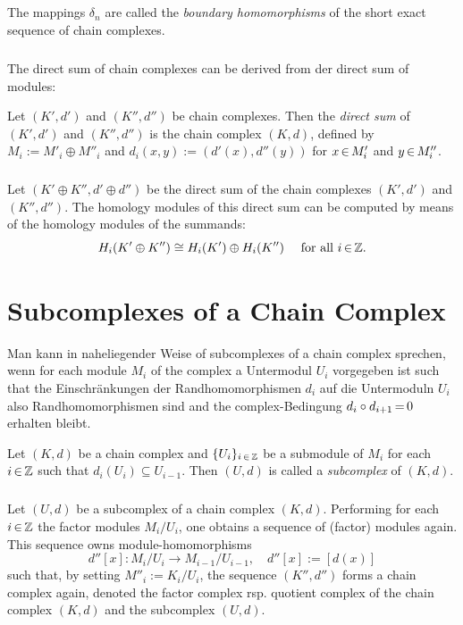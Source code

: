 \documentclass[11pt,twoside]{article}
\begin{document}
\subparagraph{}
The mappings $\delta_n$ are called the \textit{boundary homomorphisms}
of the short exact sequence of chain complexes.

\subparagraph{}
The direct sum of chain complexes can be derived from der direct sum of modules:

\begin{definition}
Let $(K',d')$ and $(K'',d'')$ be chain complexes.
Then the \textit{direct sum} of $(K',d')$ and $(K'',d'')$
is the chain complex $(K,d)$,
defined by $M_i := M'_i \oplus M''_i$ and $d_i(x,y) := (d'(x),d''(y))$
for $x {\,\in\,} M'_i$ and $y {\,\in\,} M''_i$.
\end{definition}

\subparagraph{}
Let $(K' \oplus K'', d' \oplus d'')$ be the direct sum of the chain complexes
$(K',d')$ and $(K'',d'')$.
The homology modules of this direct sum can be computed by means of
the homology modules of the summands:
\[
H_i(K' \oplus K'') \cong H_i(K') \oplus H_i(K'') \quad \mbox{ for all } i {\,\in\,} {\mathbb{Z}}.
\]

\section{Subcomplexes of a Chain Complex}
Man kann in naheliegender Weise of subcomplexes of a chain complex
sprechen,
wenn for each module $M_i$ of the complex a Untermodul $U_i$ vorgegeben ist
such that
the Einschränkungen der Randhomomorphismen $d_i$ auf die
Untermoduln $U_i$ also Randhomomorphismen sind
and the complex-Bedingung $d_i \circ d_{i+1} {\,=\,} 0$ erhalten bleibt.

\begin{definition}
Let $(K,d)$ be a chain complex and $\{U_i\}_{i {\,\in\,} {\mathbb{Z}}}$ be 
a submodule of $M_i$ for each $i {\,\in\,} {\mathbb{Z}}$
such that $d_i(U_i) \subseteq U_{i-1}$.
Then $(U,d)$ is called a \textit{subcomplex} of $(K,d)$.
\end{definition}

\subparagraph{}
Let $(U,d)$ be a subcomplex of a chain complex $(K,d)$.
Performing for each $i {\,\in\,} {\mathbb{Z}}$ the factor modules $M_i/U_i$,
one obtains a sequence of (factor) modules again.
This sequence owns module-homomorphisms 
\[
d''[x]: M_i/U_i \to M_{i-1}/U_{i-1}, \quad d''[x] := [d(x)]
\]
such that,
by setting $M''_i := K_i/U_i$,
the sequence $(K'',d'')$ forms a chain complex again,
denoted 
the factor complex rsp. quotient complex of the chain complex $(K,d)$
and the subcomplex $(U,d)$.
\end{document}
